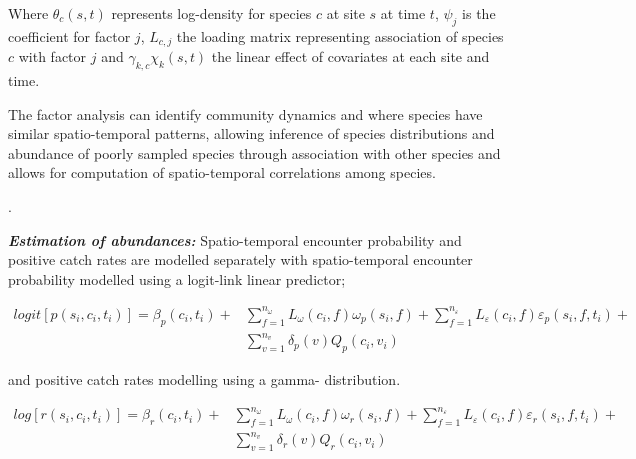 \documentclass[12pt]{article}
\begin{document}
\begin{linenumbers}
Where $\theta_{c}(s,t)$ represents log-density for species $c$
at site $s$ at time $t$, $\psi_{j}$ is the coefficient for factor $j$,
$L_{c,j}$ the loading matrix representing association of species $c$ with
factor $j$ and $\gamma_{k,c}\chi_{k}(s,t)$ the linear effect of covariates at
each site and time\cite{Thorson2016b}. 

The factor analysis can identify community dynamics and where species have
similar spatio-temporal patterns, allowing inference of species distributions
and abundance of poorly sampled species through association with other species
and allows for computation of spatio-temporal correlations among
species\cite{Thorson2016b}.

. 

\textbf{\textit{Estimation of abundances:}} Spatio-temporal encounter
probability and positive catch rates are modelled separately with
spatio-temporal encounter probability modelled using a logit-link linear
predictor;

		\begin{equation}
			\begin{split}
			logit[p(s_{i},c_{i},t_{i})] =	\beta_{p}(c_{i},t_{i}) +
			& \sum\limits_{f=1}^{n_{\omega}} L_{\omega}(c_{i},f)
			\omega_{p}(s_{i},f) + \sum\limits_{f=1}^{n_{\varepsilon}}
			L_{\varepsilon}(c_{i},f) \varepsilon_{p}(s_{i},f,t_{i}) + \\ 
			& \sum\limits_{v=1}^{n_{v}}\delta_{p}(v)Q_{p}(c_{i}, v_{i})
		\end{split}
		\end{equation}

and positive catch rates modelling using a gamma- distribution\cite{Thorson2015a}.

		\begin{equation}
			\begin{split}
			log[r(s_{i},c_{i},t_{i})] = \beta_{r}(c_{i},t_{i}) +
			& \sum\limits_{f=1}^{n_{\omega}} L_{\omega}(c_{i},f)
			\omega_{r}(s_{i},f) +\sum\limits_{f=1}^{n_{\varepsilon}} 
			L_{\varepsilon}(c_{i},f) \varepsilon_{r}(s_{i},f,t_{i}) + \\
			& \sum\limits_{v=1}^{n_{v}}\delta_{r}(v) Q_{r}(c_{i}, v_{i})
			\end{split}
		\end{equation}


\end{linenumbers}
\end{document}
